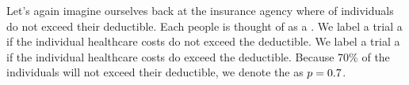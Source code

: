 \newcommand{\insureS}{\resp{not}}
\newcommand{\insureF}{\resp{exceed}}
\newcommand{\insureBinomCinDSingleScenario}{0.103}
\newcommand{\insureBinomCinD}{0.412}
\newcommand{\insureBinomEinHSingleScenario}{0.00454}
\newcommand{\insureBinomEinH}{0.254}
\newcommand{\insureBinomFourtyExpValue}{28}
\newcommand{\insureBinomFourtySD}{2.9}
\newcommand{\insureBinomFourtyLower}{22}
\newcommand{\insureBinomFourtyUpper}{34}




Let's again imagine ourselves back at the insurance agency
where \insureSperc{} of individuals do not exceed their
deductible.  Each people is thought of as a .
We label a trial a  if the individual healthcare costs
do not exceed the deductible.
We label a trial a  if the individual healthcare costs do exceed the
deductible.
Because 70\% of the individuals will not exceed their deductible,
we denote the  as
$p = 0.7{}$.


